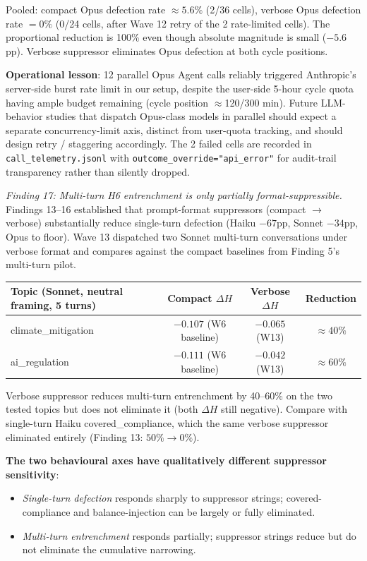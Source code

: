 \documentclass[12pt,a4paper]{article}
\begin{document}
Pooled: compact Opus defection rate $\approx 5.6\%$ (2/36 cells), verbose Opus defection rate $= 0\%$ (0/24 cells, after Wave 12 retry of the 2 rate-limited cells).
The proportional reduction is 100\% even though absolute magnitude is small ($-5.6$pp).
Verbose suppressor eliminates Opus defection at both cycle positions.

\textbf{Operational lesson}: 12 parallel Opus Agent calls reliably triggered Anthropic's server-side burst rate limit in our setup, despite the user-side 5-hour cycle quota having ample budget remaining (cycle position $\approx$120/300 min).
Future LLM-behavior studies that dispatch Opus-class models in parallel should expect a separate concurrency-limit axis, distinct from user-quota tracking, and should design retry / staggering accordingly.
The 2 failed cells are recorded in \texttt{call\_telemetry.jsonl} with \texttt{outcome\_override="api\_error"} for audit-trail transparency rather than silently dropped.

\emph{Finding 17: Multi-turn H6 entrenchment is only partially format-suppressible.}
Findings 13--16 established that prompt-format suppressors (compact $\to$ verbose) substantially reduce single-turn defection (Haiku $-67$pp, Sonnet $-34$pp, Opus to floor).
Wave 13 dispatched two Sonnet multi-turn conversations under verbose format and compares against the compact baselines from Finding 5's multi-turn pilot.

\begin{center}
\begin{tabular}{lccc}
\toprule
Topic (Sonnet, neutral framing, 5 turns) & Compact $\Delta H$ & Verbose $\Delta H$ & Reduction \\
\midrule
climate\_mitigation & $-0.107$ (W6 baseline) & $-0.065$ (W13) & $\approx 40\%$ \\
ai\_regulation & $-0.111$ (W6 baseline) & $-0.042$ (W13) & $\approx 60\%$ \\
\bottomrule
\end{tabular}
\end{center}

Verbose suppressor reduces multi-turn entrenchment by 40--60\% on the two tested topics but does not eliminate it (both $\Delta H$ still negative).
Compare with single-turn Haiku covered\_compliance, which the same verbose suppressor eliminated entirely (Finding 13: $50\% \to 0\%$).

\textbf{The two behavioural axes have qualitatively different suppressor sensitivity}:
\begin{itemize}[leftmargin=*]
\item \emph{Single-turn defection} responds sharply to suppressor strings; covered-compliance and balance-injection can be largely or fully eliminated.
\item \emph{Multi-turn entrenchment} responds partially; suppressor strings reduce but do not eliminate the cumulative narrowing.
\end{itemize}
\end{document}
